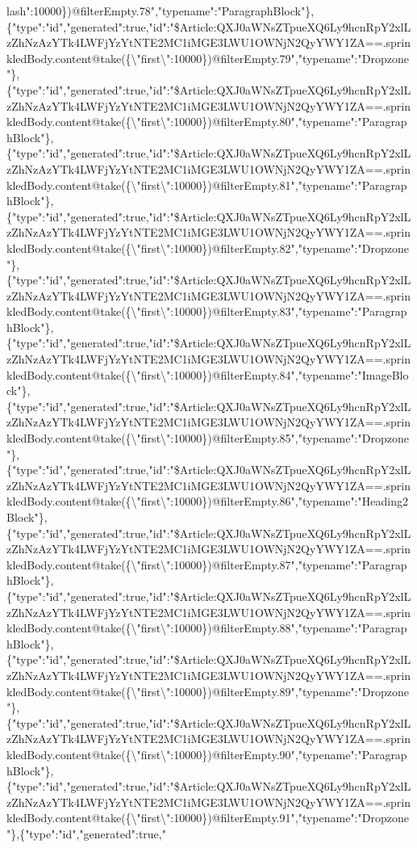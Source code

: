 lash{}":10000\})@filterEmpty.78","typename":"ParagraphBlock"\},\{"type":"id","generated":true,"id":"\$Article:QXJ0aWNsZTpueXQ6Ly9hcnRpY2xlLzZhNzAzYTk4LWFjYzYtNTE2MC1iMGE3LWU1OWNjN2QyYWY1ZA==.sprinkledBody.content@take(\{\textbackslash{}"first\textbackslash{}":10000\})@filterEmpty.79","typename":"Dropzone"\},\{"type":"id","generated":true,"id":"\$Article:QXJ0aWNsZTpueXQ6Ly9hcnRpY2xlLzZhNzAzYTk4LWFjYzYtNTE2MC1iMGE3LWU1OWNjN2QyYWY1ZA==.sprinkledBody.content@take(\{\textbackslash{}"first\textbackslash{}":10000\})@filterEmpty.80","typename":"ParagraphBlock"\},\{"type":"id","generated":true,"id":"\$Article:QXJ0aWNsZTpueXQ6Ly9hcnRpY2xlLzZhNzAzYTk4LWFjYzYtNTE2MC1iMGE3LWU1OWNjN2QyYWY1ZA==.sprinkledBody.content@take(\{\textbackslash{}"first\textbackslash{}":10000\})@filterEmpty.81","typename":"ParagraphBlock"\},\{"type":"id","generated":true,"id":"\$Article:QXJ0aWNsZTpueXQ6Ly9hcnRpY2xlLzZhNzAzYTk4LWFjYzYtNTE2MC1iMGE3LWU1OWNjN2QyYWY1ZA==.sprinkledBody.content@take(\{\textbackslash{}"first\textbackslash{}":10000\})@filterEmpty.82","typename":"Dropzone"\},\{"type":"id","generated":true,"id":"\$Article:QXJ0aWNsZTpueXQ6Ly9hcnRpY2xlLzZhNzAzYTk4LWFjYzYtNTE2MC1iMGE3LWU1OWNjN2QyYWY1ZA==.sprinkledBody.content@take(\{\textbackslash{}"first\textbackslash{}":10000\})@filterEmpty.83","typename":"ParagraphBlock"\},\{"type":"id","generated":true,"id":"\$Article:QXJ0aWNsZTpueXQ6Ly9hcnRpY2xlLzZhNzAzYTk4LWFjYzYtNTE2MC1iMGE3LWU1OWNjN2QyYWY1ZA==.sprinkledBody.content@take(\{\textbackslash{}"first\textbackslash{}":10000\})@filterEmpty.84","typename":"ImageBlock"\},\{"type":"id","generated":true,"id":"\$Article:QXJ0aWNsZTpueXQ6Ly9hcnRpY2xlLzZhNzAzYTk4LWFjYzYtNTE2MC1iMGE3LWU1OWNjN2QyYWY1ZA==.sprinkledBody.content@take(\{\textbackslash{}"first\textbackslash{}":10000\})@filterEmpty.85","typename":"Dropzone"\},\{"type":"id","generated":true,"id":"\$Article:QXJ0aWNsZTpueXQ6Ly9hcnRpY2xlLzZhNzAzYTk4LWFjYzYtNTE2MC1iMGE3LWU1OWNjN2QyYWY1ZA==.sprinkledBody.content@take(\{\textbackslash{}"first\textbackslash{}":10000\})@filterEmpty.86","typename":"Heading2Block"\},\{"type":"id","generated":true,"id":"\$Article:QXJ0aWNsZTpueXQ6Ly9hcnRpY2xlLzZhNzAzYTk4LWFjYzYtNTE2MC1iMGE3LWU1OWNjN2QyYWY1ZA==.sprinkledBody.content@take(\{\textbackslash{}"first\textbackslash{}":10000\})@filterEmpty.87","typename":"ParagraphBlock"\},\{"type":"id","generated":true,"id":"\$Article:QXJ0aWNsZTpueXQ6Ly9hcnRpY2xlLzZhNzAzYTk4LWFjYzYtNTE2MC1iMGE3LWU1OWNjN2QyYWY1ZA==.sprinkledBody.content@take(\{\textbackslash{}"first\textbackslash{}":10000\})@filterEmpty.88","typename":"ParagraphBlock"\},\{"type":"id","generated":true,"id":"\$Article:QXJ0aWNsZTpueXQ6Ly9hcnRpY2xlLzZhNzAzYTk4LWFjYzYtNTE2MC1iMGE3LWU1OWNjN2QyYWY1ZA==.sprinkledBody.content@take(\{\textbackslash{}"first\textbackslash{}":10000\})@filterEmpty.89","typename":"Dropzone"\},\{"type":"id","generated":true,"id":"\$Article:QXJ0aWNsZTpueXQ6Ly9hcnRpY2xlLzZhNzAzYTk4LWFjYzYtNTE2MC1iMGE3LWU1OWNjN2QyYWY1ZA==.sprinkledBody.content@take(\{\textbackslash{}"first\textbackslash{}":10000\})@filterEmpty.90","typename":"ParagraphBlock"\},\{"type":"id","generated":true,"id":"\$Article:QXJ0aWNsZTpueXQ6Ly9hcnRpY2xlLzZhNzAzYTk4LWFjYzYtNTE2MC1iMGE3LWU1OWNjN2QyYWY1ZA==.sprinkledBody.content@take(\{\textbackslash{}"first\textbackslash{}":10000\})@filterEmpty.91","typename":"Dropzone"\},\{"type":"id","generated":true,"